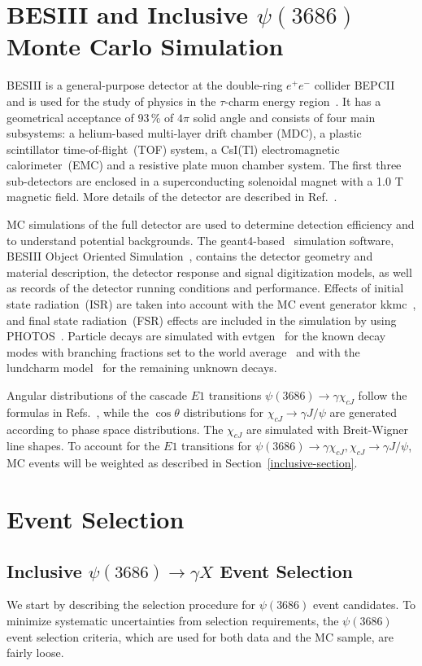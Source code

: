 \documentclass[aps,prd,twocolumn,showpacs,floatfix,byrevtex]{revtex4-1}
\begin{document}
\section{\boldmath BESIII and Inclusive $\psi(3686)$ Monte Carlo Simulation}
BESIII is a general-purpose detector at the double-ring
$e^+e^-$ collider BEPCII and is used for the study of physics in
the $\tau$-charm energy region~\cite{taucharm}. It has a geometrical
acceptance of 93\,\% of $4\pi$ solid angle and consists of four main
subsystems: a helium-based multi-layer drift chamber (MDC), a plastic
scintillator time-of-flight~(TOF) system, a CsI(Tl) electromagnetic
calorimeter~(EMC) and a resistive plate muon chamber system. The first
three sub-detectors are enclosed in a superconducting solenoidal
magnet with a 1.0 T magnetic field. More details of the detector are
described in Ref.~\cite{Ablikim2010345}.

MC simulations of the full detector are used to determine detection
efficiency and to understand potential backgrounds. The {\sc
  geant4}-based~\cite{GEANT4} simulation software, BESIII Object
Oriented Simulation~\cite{BOOST}, contains the detector geometry and
material description, the detector response and signal digitization
models, as well as records of the detector running conditions and
performance. Effects of initial state radiation~(ISR) are taken into
account with the MC event generator {\sc kkmc}~\cite{kkmc1,kkmc2}, and
final state radiation~(FSR) effects are included in the simulation by
using PHOTOS~\cite{PHOTOS}.  Particle decays are simulated with {\sc
  evtgen}~\cite{evtgen} for the known decay modes with branching
fractions set to the world average~\cite{PDG16} and with the {\sc
  lundcharm} model~\cite{lund} for the remaining unknown decays.

Angular distributions of the cascade $E1$ transitions $\psi(3686) \to
\gamma \chi_{cJ}$ follow the formulas in Refs.~\cite{Karl,liao}, while
the $\cos \theta$ distributions for $\chi_{cJ} \to \gamma J/\psi$ are
generated according to phase space distributions.  The $\chi_{cJ}$ are
simulated with Breit-Wigner line shapes.  To account for the $E1$
transitions for $\psi(3686) \to \gamma \chi_{cJ}, \chi_{cJ} \to \gamma
J/\psi$, MC events will be weighted as described in
Section~\ref{inclusive-section}.


\section{\boldmath Event Selection}
\subsection{\boldmath Inclusive $\psi(3686) \to \gamma X$ Event
  Selection}
\label{inc_sel}
We start by describing the selection procedure for $\psi(3686)$ event
candidates.  To minimize systematic uncertainties from selection
requirements, the $\psi(3686)$ event selection criteria, which are
used for both data and the MC sample, are fairly loose.
\end{document}
